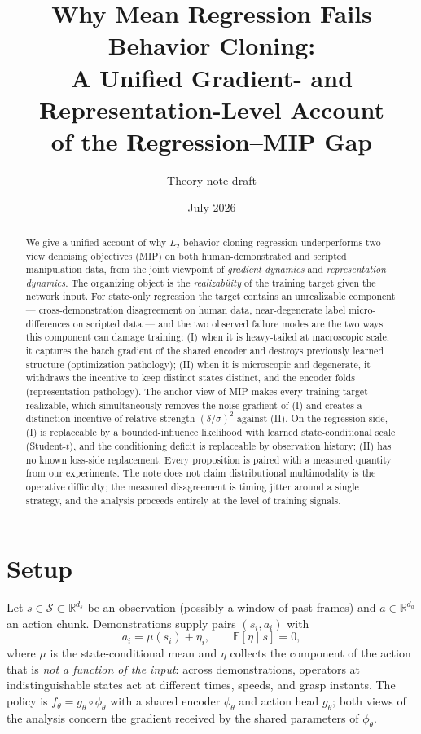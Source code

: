 \documentclass[11pt]{article}
\title{Why Mean Regression Fails Behavior Cloning:\\
A Unified Gradient- and Representation-Level Account\\
of the Regression--MIP Gap}
\author{Theory note draft}
\date{July 2026}
\newcommand{\E}{\mathbb{E}}
\newcommand{\R}{\mathbb{R}}
\newcommand{\enc}{\phi_\theta}
\newcommand{\head}{g_\theta}
\newcommand{\pol}{f_\theta}
\begin{document}
\maketitle

\begin{abstract}
We give a unified account of why $L_2$ behavior-cloning regression underperforms
two-view denoising objectives (MIP) on both human-demonstrated and scripted
manipulation data, from the joint viewpoint of \emph{gradient dynamics} and
\emph{representation dynamics}. The organizing object is the \emph{realizability}
of the training target given the network input. For state-only regression the
target contains an unrealizable component --- cross-demonstration disagreement on
human data, near-degenerate label micro-differences on scripted data --- and the
two observed failure modes are the two ways this component can damage training:
(I) when it is heavy-tailed at macroscopic scale, it captures the batch gradient
of the shared encoder and destroys previously learned structure (optimization
pathology); (II) when it is microscopic and degenerate, it withdraws the
incentive to keep distinct states distinct, and the encoder folds (representation
pathology). The anchor view of MIP makes every training target realizable, which
simultaneously removes the noise gradient of (I) and creates a distinction
incentive of relative strength $(\delta/\sigma)^2$ against (II). On the
regression side, (I) is replaceable by a bounded-influence likelihood with
learned state-conditional scale (Student-$t$), and the conditioning deficit is
replaceable by observation history; (II) has no known loss-side replacement.
Every proposition is paired with a measured quantity from our experiments. The
note does not claim distributional multimodality is the operative difficulty;
the measured disagreement is timing jitter around a single strategy, and the
analysis proceeds entirely at the level of training signals.
\end{abstract}

\section{Setup}

Let $s \in \mathcal{S} \subset \R^{d_s}$ be an observation (possibly a window of
past frames) and $a \in \R^{d_a}$ an action chunk. Demonstrations supply pairs
$(s_i, a_i)$ with
\begin{equation}
a_i = \mu(s_i) + \eta_i, \qquad \E[\eta \mid s] = 0 ,
\end{equation}
where $\mu$ is the state-conditional mean and $\eta$ collects the component of
the action that is \emph{not a function of the input}: across demonstrations,
operators at indistinguishable states act at different times, speeds, and grasp
instants. The policy is $\pol = \head \circ \enc$ with a shared encoder $\enc$
and action head $\head$; both views of the analysis concern the gradient
received by the shared parameters of $\enc$.
\end{document}
